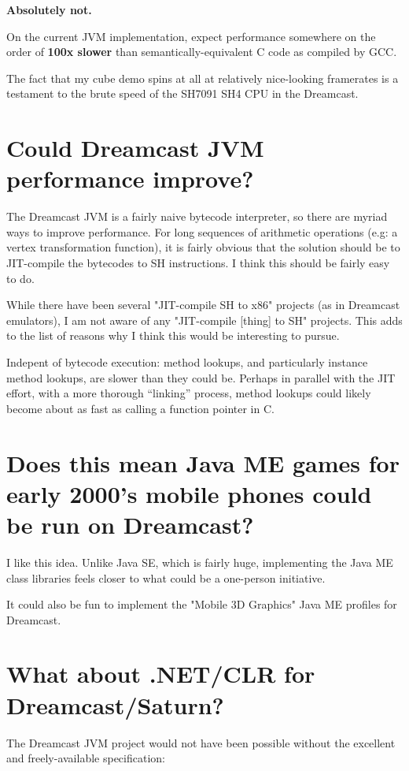\documentclass[20pt]{article}
\begin{document}
\textbf{Absolutely not.}

On the current JVM implementation, expect performance
somewhere on the order of \textbf{100x slower} than semantically-equivalent C
code as compiled by GCC.

The fact that my cube demo spins at all at relatively nice-looking framerates is
a testament to the brute speed of the SH7091 SH4 CPU in the Dreamcast.

\section{Could Dreamcast JVM performance improve?}

The Dreamcast JVM is a fairly naive bytecode interpreter, so there are myriad
ways to improve performance. For long sequences of arithmetic operations (e.g: a
vertex transformation function), it is fairly obvious that the solution should
be to JIT-compile the bytecodes to SH instructions. I think this should be
fairly easy to do.

While there have been several "JIT-compile SH to x86" projects (as in Dreamcast
emulators), I am not aware of any "JIT-compile [thing] to SH" projects. This
adds to the list of reasons why I think this would be interesting to pursue.

Indepent of bytecode execution: method lookups, and particularly instance method
lookups, are slower than they could be. Perhaps in parallel with the JIT effort,
with a more thorough “linking” process, method lookups could likely become about
as fast as calling a function pointer in C.

\section{Does this mean Java ME games for early 2000's mobile phones could be run on Dreamcast?}

I like this idea. Unlike Java SE, which is fairly huge, implementing the Java ME
class libraries feels closer to what could be a one-person initiative.

It could also be fun to implement the "Mobile 3D Graphics" Java ME profiles for
Dreamcast.

\section{What about .NET/CLR for Dreamcast/Saturn?}

The Dreamcast JVM project would not have been possible without the excellent and
freely-available specification:
\end{document}

